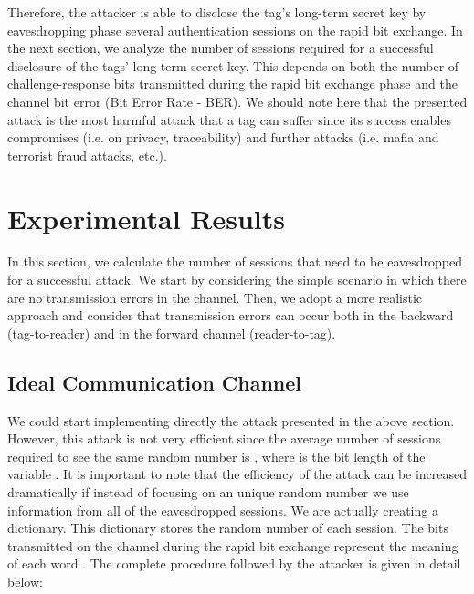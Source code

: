 \documentclass{article}
\begin{document}
Therefore, the attacker is able to disclose the tag's long-term secret key by eavesdropping phase several authentication sessions on the rapid bit exchange. In the next section, we analyze the number of sessions required for a successful disclosure of the tags' long-term secret key. This depends on both the number of challenge-response bits  transmitted during the rapid bit exchange phase and the channel bit error (Bit Error Rate - BER).  We should note here that the presented attack is the most harmful attack that a tag can suffer since its success enables compromises (i.e. on privacy, traceability) and further attacks (i.e. mafia and terrorist fraud attacks, etc.).

\section{Experimental Results}\label{sec::experiments}
In this section, we calculate the number of sessions that need to be eavesdropped for a successful attack.  We start by considering the simple scenario in which there are no transmission errors in the channel.  Then, we adopt a more realistic approach and consider that transmission errors can occur both in the backward (tag-to-reader) and in the forward channel (reader-to-tag).

\subsection{Ideal Communication Channel}\label{sec::idealcomm}

We could start implementing directly the attack presented in the above section. However, this attack is not very efficient since the average number of sessions required to see the same random number  is , where  is the bit length of the variable . It is important to note that the efficiency of the attack can be increased dramatically if instead of focusing on an unique random number  we use information from all of the eavesdropped sessions. We are actually creating a dictionary. This dictionary stores the random number  of each session. The bits  transmitted on the channel during the rapid bit exchange represent the meaning of each word . The complete procedure followed by the attacker is given in detail below:
\end{document}
